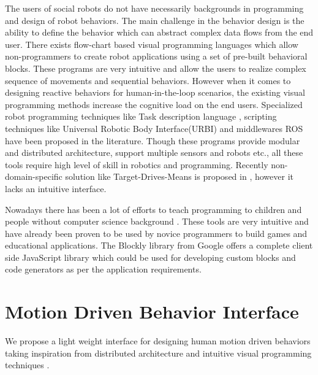 \documentclass{llncs}
\begin{document}
	The users of social robots do not have necessarily backgrounds in programming and design of robot behaviors. The main challenge in the behavior design is the ability to define the behavior which can abstract complex data flows from the end user. There exists flow-chart based visual programming languages \cite{Choregraphe} which allow non-programmers to create robot applications using a set of pre-built behavioral blocks. These programs are very intuitive and allow the users to realize complex sequence of movements and sequential behaviors. However when it comes to designing reactive behaviors for human-in-the-loop scenarios, the existing visual programming methods increase the cognitive load on the end users. Specialized robot programming techniques like Task description language \cite{Simmons724883}, scripting techniques like Universal Robotic Body Interface(URBI) \cite{Baillie4814281} and middlewares ROS \cite{quigley2009ros} have been proposed in the literature. Though these programs provide modular and distributed architecture, support multiple sensors and robots etc., all these tools require high level of skill in robotics and programming. Recently non-domain-specific solution like Target-Drives-Means is proposed in \cite{BerenzTDM2014}, however it lacks an intuitive interface.
	
	Nowadays there has been a lot of efforts to teach programming to children and people without computer science background \cite{Scratch}\cite{Blockly}. These tools are very intuitive and have already been proven to be used by novice programmers to build games and educational applications. The Blockly library \cite{Blockly} from Google offers a complete client side JavaScript library which could be used for developing custom blocks and code generators as per the application requirements.
\section{Motion Driven Behavior Interface}
We propose a light weight interface for designing human motion driven behaviors taking inspiration from distributed architecture \cite{quigley2009ros} and intuitive visual programming techniques \cite{Blockly}. 
\end{document}
